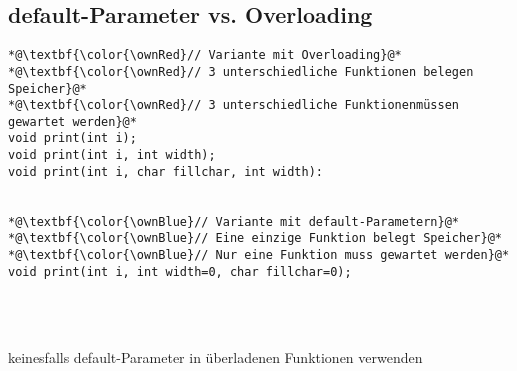 \subsection{default-Parameter vs. Overloading\hfill}
\label{sec:default-Parameter vs. Overloading}
\noindent
\begin{minipage}{\linewidth}
\begin{lstlisting}
*@\textbf{\color{\ownRed}// Variante mit Overloading}@*
*@\textbf{\color{\ownRed}// 3 unterschiedliche Funktionen belegen Speicher}@*
*@\textbf{\color{\ownRed}// 3 unterschiedliche Funktionenmüssen gewartet werden}@*
void print(int i);
void print(int i, int width);
void print(int i, char fillchar, int width):
	
	
*@\textbf{\color{\ownBlue}// Variante mit default-Parametern}@*
*@\textbf{\color{\ownBlue}// Eine einzige Funktion belegt Speicher}@*
*@\textbf{\color{\ownBlue}// Nur eine Funktion muss gewartet werden}@*
void print(int i, int width=0, char fillchar=0);	
\end{lstlisting}
\end{minipage}
\\
\\
\begin{achtung}
keinesfalls default-Parameter in überladenen Funktionen verwenden
\end{achtung}


 